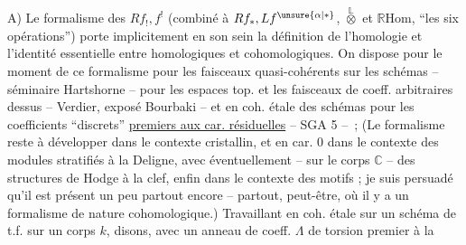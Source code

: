 %
A) Le formalisme des $Rf_!, f^!$ (combiné à $Rf_*, Lf^{\unsure{\alpha|*}}$, $\overset{\mathbb{L}}{\otimes}$ et $\mathbb{R}\mathrm{Hom}$, ``les six opérations'') porte implicitement en son sein la définition de l'homologie et l'identité essentielle entre  homologiques et cohomologiques.  On dispose pour le moment de ce formalisme pour les faisceaux quasi-cohérents sur les schémas -- séminaire Hartshorne -- pour les espaces top. et les faisceaux de coeff. arbitraires dessus -- Verdier, exposé Bourbaki -- et en coh. étale des schémas pour les coefficients ``discrets''  \uline{premiers aux  car. résiduelles} -- SGA 5 -- \,; (Le formalisme reste à développer dans le contexte cristallin, et en car. $0$ dans le contexte des modules stratifiés  à la Deligne, avec éventuellement -- sur le corps $\mathbb{C}$ -- des structures de Hodge à la clef, enfin dans le contexte des motifs ; je suis persuadé qu'il est présent un peu partout encore -- partout, peut-être, où il y a un formalisme de nature cohomologique.) Travaillant en coh. étale sur un schéma  de t.f. sur un corps $k$, disons, avec un anneau de coeff. $\Lambda$ de torsion premier à la \unsure{,}
